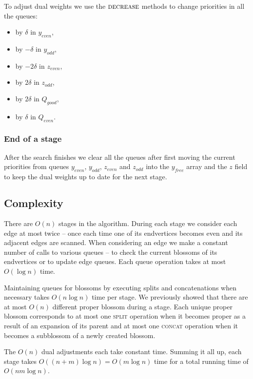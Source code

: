 To adjust dual weights we use the $\textsc{decrease}$ methods to change priorities in all the queues:
\begin{itemize}
    \item by $\delta$ in $y_{even}$,
    \item by $-\delta$ in $y_{odd}$, 
    \item by $-2\delta$ in $z_{even}$,
    \item by $2\delta$ in $z_{odd}$,
    \item by $2\delta$ in $Q_{good}$,
    \item by $\delta$ in $Q_{even}$.
\end{itemize}

\subsubsection*{End of a stage} 
After the search finishes we clear all the queues after first moving the current priorities from queues $y_{even}$, $y_{odd}$, $z_{even}$ and $z_{odd}$ into the $y_{free}$ array and the $z$ field to keep the dual weights up to date for the next stage.

\subsection{Complexity}

There are $O(n)$ stages in the algorithm. During each stage we consider each edge at most twice – once each time one of its endvertices becomes even and its adjacent edges are scanned. When considering an edge we make a constant number of calls to various queues – to check the current blossoms of its endvertices or to update edge queues. Each queue operation takes at most $O(\log n)$ time. 

Maintaining queues for blossoms by executing splits and concatenations when necessary takes $O(n \log n)$ time per stage. We previously showed that there are at most $O(n)$ different proper blossom during a stage. Each unique proper blossom corresponds to at most one \textsc{split} operation when it becomes proper as a result of an expansion of its parent and at most one \textsc{concat} operation when it becomes a subblossom of a newly created blossom.

The $O(n)$ dual adjustments each take constant time. Summing it all up, each stage takes $O((n + m) \log n) = O(m \log n)$ time for a total running time of $O(nm \log n)$.
